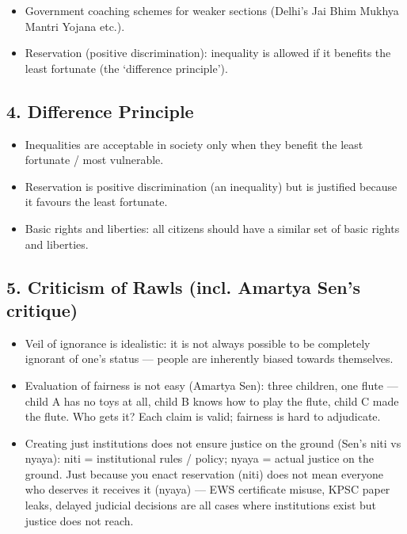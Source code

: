 \begin{GovtPolicy}
\begin{itemize}
\item Government coaching schemes for weaker sections (Delhi's Jai Bhim Mukhya Mantri Yojana etc.).
\item Reservation (positive discrimination): inequality is allowed if it benefits the least fortunate (the `difference principle').
\end{itemize}
\end{GovtPolicy}

\subsection*{4. Difference Principle}
\begin{KeyConcept}
\begin{itemize}
\item Inequalities are acceptable in society only when they benefit the least fortunate / most vulnerable.
\item Reservation is positive discrimination (an inequality) but is justified because it favours the least fortunate.
\item Basic rights and liberties: all citizens should have a similar set of basic rights and liberties.
\end{itemize}
\end{KeyConcept}

\subsection*{5. Criticism of Rawls (incl. Amartya Sen's critique)}
\begin{itemize}
\item Veil of ignorance is idealistic: it is not always possible to be completely ignorant of one's status --- people are inherently biased towards themselves.
\item Evaluation of fairness is not easy (Amartya Sen): three children, one flute --- child A has no toys at all, child B knows how to play the flute, child C made the flute. Who gets it? Each claim is valid; fairness is hard to adjudicate.
\item Creating just institutions does not ensure justice on the ground (Sen's niti vs nyaya): niti = institutional rules / policy; nyaya = actual justice on the ground. Just because you enact reservation (niti) does not mean everyone who deserves it receives it (nyaya) --- EWS certificate misuse, KPSC paper leaks, delayed judicial decisions are all cases where institutions exist but justice does not reach.
\end{itemize}

